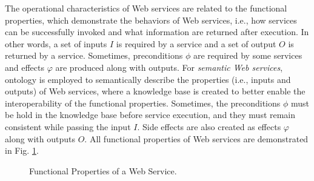 The operational characteristics of Web services are related to the functional properties, which demonstrate the behaviors of Web services, i.e., how services can be successfully invoked and what information are returned after execution. In other words, a set of inputs $I$ is required by a service and a set of output $O$ is returned by a service. Sometimes, preconditions $\phi$ are required by some services and effects $\varphi$ are produced along with outputs. For \emph{semantic Web services}, ontology is employed to semantically describe the properties (i.e., inputs and outputs) of Web services, where a knowledge base is created to better enable the interoperability of the functional properties. Sometimes, the preconditions $\phi$ must be hold in the knowledge base before service execution, and they must remain consistent while passing the input $I$. Side effects are also created as effects $\varphi$ along with outputs $O$. All functional properties of Web services are demonstrated in Fig. \ref{fig:ws}.


\begin{figure}
\centerline{
}
\caption{Functional Properties of a Web Service.}
\label{fig:ws}
\end{figure}


